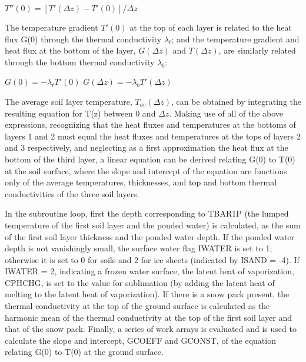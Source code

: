 $T''(0) = [T'(\Delta z) - T'(0)]/ \Delta z$

The temperature gradient $T'(0)$ at the top of each layer is related to the heat flux G(0) through the thermal conductivity $\lambda_t$; and the temperature gradient and heat flux at the bottom of the layer, $G(\Delta z)$ and $T(\Delta z)$, are similarly related through the bottom thermal conductivity $\lambda_b$\+:

$G(0) = - \lambda_t T'(0)$ $G(\Delta z) = - \lambda_b T'(\Delta z)$

The average soil layer temperature, $T_{av}(\Delta z)$, can be obtained by integrating the resulting equation for T(z) between 0 and $\Delta z$. Making use of all of the above expressions, recognizing that the heat fluxes and temperatures at the bottoms of layers 1 and 2 must equal the heat fluxes and temperatures at the tops of layers 2 and 3 respectively, and neglecting as a first approximation the heat flux at the bottom of the third layer, a linear equation can be derived relating G(0) to T(0) at the soil surface, where the slope and intercept of the equation are functions only of the average temperatures, thicknesses, and top and bottom thermal conductivities of the three soil layers.

In the subroutine loop, first the depth corresponding to T\+B\+A\+R1\+P (the lumped temperature of the first soil layer and the ponded water) is calculated, as the sum of the first soil layer thickness and the ponded water depth. If the ponded water depth is not vanishingly small, the surface water flag I\+W\+A\+T\+E\+R is set to 1; otherwise it is set to 0 for soils and 2 for ice sheets (indicated by I\+S\+A\+N\+D = -\/4). If I\+W\+A\+T\+E\+R = 2, indicating a frozen water surface, the latent heat of vaporization, C\+P\+H\+C\+H\+G, is set to the value for sublimation (by adding the latent heat of melting to the latent heat of vaporization). If there is a snow pack present, the thermal conductivity at the top of the ground surface is calculated as the harmonic mean of the thermal conductivity at the top of the first soil layer and that of the snow pack. Finally, a series of work arrays is evaluated and is used to calculate the slope and intercept, G\+C\+O\+E\+F\+F and G\+C\+O\+N\+S\+T, of the equation relating G(0) to T(0) at the ground surface.
